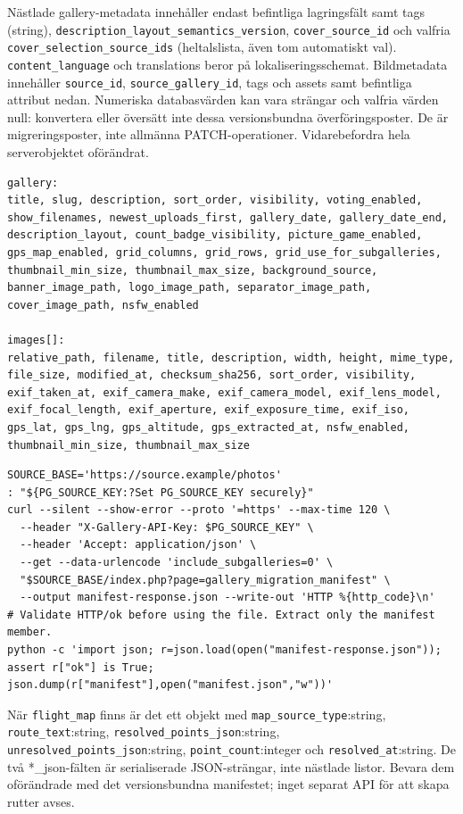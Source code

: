\documentclass[11pt,a4paper]{article}
\newcommand{\codeword}[1]{\nolinkurl{#1}}
\begin{document}
Nästlade gallery-metadata innehåller endast befintliga lagringsfält samt tags (string),
\codeword{description_layout_semantics_version}, \codeword{cover_source_id} och valfria
\codeword{cover_selection_source_ids} (heltalslista, även tom automatiskt val).
\codeword{content_language} och translations beror på lokaliseringsschemat. Bildmetadata
innehåller \codeword{source_id}, \codeword{source_gallery_id}, tags och assets samt
befintliga attribut nedan. Numeriska databasvärden kan vara strängar och valfria värden
null: konvertera eller översätt inte dessa versionsbundna överföringsposter. De är
migreringsposter, inte allmänna PATCH-operationer. Vidarebefordra hela serverobjektet
oförändrat.

\begin{lstlisting}[language={}]
gallery:
title, slug, description, sort_order, visibility, voting_enabled,
show_filenames, newest_uploads_first, gallery_date, gallery_date_end,
description_layout, count_badge_visibility, picture_game_enabled,
gps_map_enabled, grid_columns, grid_rows, grid_use_for_subgalleries,
thumbnail_min_size, thumbnail_max_size, background_source,
banner_image_path, logo_image_path, separator_image_path,
cover_image_path, nsfw_enabled

images[]:
relative_path, filename, title, description, width, height, mime_type,
file_size, modified_at, checksum_sha256, sort_order, visibility,
exif_taken_at, exif_camera_make, exif_camera_model, exif_lens_model,
exif_focal_length, exif_aperture, exif_exposure_time, exif_iso,
gps_lat, gps_lng, gps_altitude, gps_extracted_at, nsfw_enabled,
thumbnail_min_size, thumbnail_max_size
\end{lstlisting}

\begin{lstlisting}[language={}]
SOURCE_BASE='https://source.example/photos'
: "${PG_SOURCE_KEY:?Set PG_SOURCE_KEY securely}"
curl --silent --show-error --proto '=https' --max-time 120 \
  --header "X-Gallery-API-Key: $PG_SOURCE_KEY" \
  --header 'Accept: application/json' \
  --get --data-urlencode 'include_subgalleries=0' \
  "$SOURCE_BASE/index.php?page=gallery_migration_manifest" \
  --output manifest-response.json --write-out 'HTTP %{http_code}\n'
# Validate HTTP/ok before using the file. Extract only the manifest member.
python -c 'import json; r=json.load(open("manifest-response.json")); assert r["ok"] is True; json.dump(r["manifest"],open("manifest.json","w"))'
\end{lstlisting}

När \codeword{flight_map} finns är det ett objekt med \codeword{map_source_type}:string,
\codeword{route_text}:string, \codeword{resolved_points_json}:string,
\codeword{unresolved_points_json}:string, \codeword{point_count}:integer och
\codeword{resolved_at}:string. De två *\_json-fälten är serialiserade JSON-strängar, inte
nästlade listor. Bevara dem oförändrade med det versionsbundna manifestet; inget separat API
för att skapa rutter avses.
\end{document}
